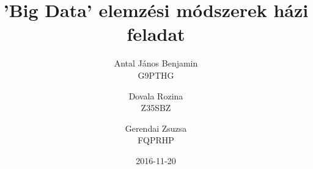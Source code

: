 \documentclass{article}
\date{2016-11-20}
\title{'Big Data' elemzési módszerek házi feladat}
\author{Antal János Benjamin\\G9PTHG \and Dovala Rozina\\Z35SBZ \and Gerendai Zsuzsa\\FQPRHP}
\numberwithin{figure}{section}
\begin{document}
	\begin{sloppypar}
		\maketitle
		\newpage
		
		\newpage
		
	\end{sloppypar}
\end{document}
